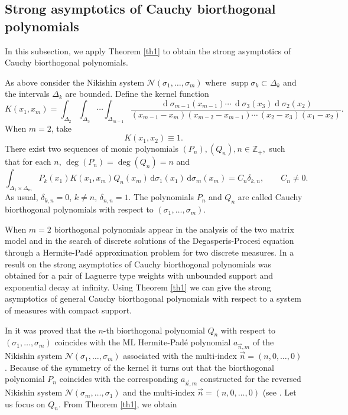 \documentclass{amsart}
\numberwithin{equation}{section}
\theoremstyle{definition}
\DeclareMathOperator{\D}{d}        %
\DeclareMathOperator{\supp}{supp}  %
\newcommand{\n}{\vec{n}}          %
\begin{document}
\subsection{Strong asymptotics of Cauchy biorthogonal polynomials}  In this subsection, we apply Theorem \ref{th1} to obtain the strong asymptotics of Cauchy biorthogonal polynomials.

As above consider the Nikishin system $\mathcal{N}(\sigma_1,\ldots,\sigma_m)$ where $\supp \sigma_k \subset \Delta_k$ and the intervals $\Delta_k$ are bounded. Define the kernel function
\[
  K(x_1,x_m) = \int_{\Delta_2}\int_{\Delta_3}\cdots \int_{\Delta_{m-1} }
		\frac{\, \D \sigma_{m-1}(x_{m-1})\cdots \, \D\sigma_3(x_3)\D\sigma_2(x_2)   }
		{(x_{m-1}-x_m)(x_{m-2}-x_{m-1})\cdots\,(x_2-x_3)(x_1-x_2)  }.
\]
When $m=2$, take
\[ K(x_1,x_2) \equiv 1.
\]
 There exist two sequences of monic polynomials $(P_n), (Q_n), n \in \mathbb{Z}_+,$ such that for each $n$, $\deg(P_n) = \deg(Q_n) = n$ and
\[
  \int_{\Delta_1\times \Delta_m} P_k(x_1) K(x_1,x_m) Q_n(x_m) \,\mbox{d} \sigma_1(x_1) \,\mbox{d} \sigma_m(x_m)  = C_n \delta_{k,n},\qquad C_n \neq 0.
\]
As usual, $\delta_{k,n} = 0$, $k \neq n$, $\delta_{n,n} = 1$. The polynomials $P_n$ and $Q_n$ are called Cauchy biorthogonal polynomials with respect to $(\sigma_1,\ldots,\sigma_m)$.

When $m=2$ biorthogonal polynomials appear in the analysis of the two matrix model \cite{Ber,BGS13} and
in the search of discrete solutions of the Degasperis-Procesi equation \cite{Bertola:CBOPs} through a Hermite-Pad\'e approximation problem for two discrete measures.  In \cite{BGS13} a result on the strong asymptotics of Cauchy biorthogonal polynomials was obtained for a pair of Laguerre type weights with unbounded support and exponential decay at infinity. Using Theorem \ref{th1} we can give the strong asymptotics of general Cauchy biorthogonal polynomials with respect to a system of measures with compact support.

In \cite[Lemma 2.4]{ULS20} it was proved that the $n$-th biorthogonal polynomial $Q_n$ with respect to $(\sigma_1,\ldots,\sigma_m)$ coincides with the ML Hermite-Pad\'e polynomial $a_{\n,m}$  of the Nikishin system $\mathcal{N}(\sigma_1,\ldots,\sigma_m)$ associated with the multi-index $\n = (n,0,\ldots,0)$. Because of the symmetry of the kernel it turns out that the biorthogonal polynomial $P_n$ coincides with the corresponding $a_{\n,m}$ constructed for the reversed Nikishin system $\mathcal{N}(\sigma_m,\ldots,\sigma_1)$ and the multi-index $\n = (n,0, \ldots,0)$ (see \cite[Subsection 2.3]{ULS20}. Let us focus on $Q_n$. From Theorem \ref{th1}, we obtain
\end{document}
